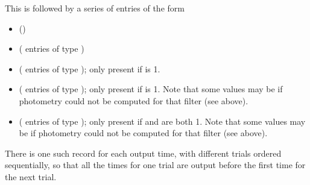 \documentclass[letterpaper,10pt,english]{sphinxmanual}
\begin{document}
This is followed by a series of entries of the form
\begin{itemize}
\item {} 
 ()

\item {} 
 ( entries of type )

\item {} 
 ( entries of type ); only present if  is 1.

\item {} 
 ( entries of type ); only present if  is 1. Note that some values may be  if photometry could not be computed for that filter (see above).

\item {} 
 ( entries of type ); only present if  and  are both 1. Note that some values may be  if photometry could not be computed for that filter (see above).

\end{itemize}

There is one such record for each output time, with different trials ordered sequentially, so that all the times for one trial are output before the first time for the next trial.
\end{document}
